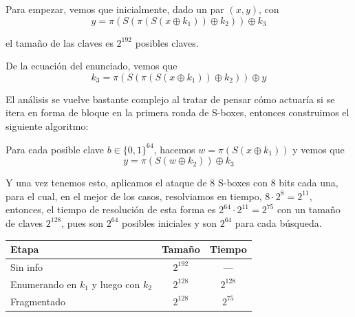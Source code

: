 \documentclass{article}
\begin{document}
    Para empezar, vemos que inicialmente, dado un par $(x, y)$, con 
      \[y = \pi(S(\pi(S(x \oplus k_1)) \oplus k_2)) \oplus k_3\]

    el tamaño de las claves es $2^{192}$ posibles claves.

    De la ecuación del enunciado, vemos que 
      \[k_3 = \pi(S(\pi(S(x \oplus k_1)) \oplus k_2)) \oplus y\]


    El análisis se vuelve bastante complejo al tratar de pensar 
    cómo actuaría si se itera en forma de bloque en la primera ronda de S-boxes,
    entonces construimos el siguiente algoritmo:
    \newline \newline

    Para cada posible clave $b \in \{0, 1\}^{64}$, hacemos 
    $w = \pi(S(x \oplus k_1))$ y vemos que 
      \[y = \pi(S(w \oplus k_2)) \oplus k_3\]

    Y una vez tenemos esto, aplicamos el ataque de 8 S-boxes con 
    $8$ bits cada una, para el cual, en el mejor de los casos, resolviamos en 
    tiempo, $8 \cdot 2^8 = 2^{11}$, entonces, el tiempo de resolución de esta forma es 
    $2^{64} \cdot 2^{11} = 2^{75}$ con un tamaño de claves $2^{128}$, pues 
    son $2^{64}$ posibles iniciales y son $2^{64}$ para cada búsqueda.

    \begin{table}[h]
      \centering

      \vspace{0.2cm}
      \begin{tabular}{lcc}
        \toprule
        Etapa & Tamaño & Tiempo \\
        \midrule
        Sin info & $2^{192}$ & --- \\
        Enumerando en $k_1$ y luego con $k_2$ & $2^{128}$ & $2^{128}$ \\
        Fragmentado & $2^{128}$ & $2^{75}$ \\
        \bottomrule
      \end{tabular}
    \end{table}
\end{document}

